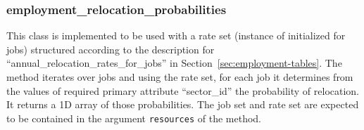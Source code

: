 \subsubsection{employment_relocation_probabilities}
%
This class is implemented to be used with a rate set (instance of
 initialized for jobs) structured according to the description
for ``annual_relocation_rates_for_jobs'' in
Section~\ref{sec:employment-tables}. The  method iterates over
jobs and using the rate set, for each job it determines from the values of
required primary attribute \primaryattributesindex ``sector_id'' the probability of relocation. It
returns a 1D array of those probabilities. The job set and rate set are
expected to be contained in the argument \verb|resources| of the
 method.

%
